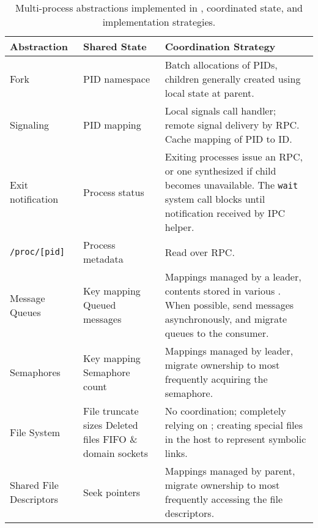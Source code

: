 \begin{table}
\footnotesize
\centering
\begin{tabular}{|p{}|p{}|p{}|}
\hline
{\bf Ab\-strac\-tion} & {\bf Shared State} & {\bf Coordination Strategy} \\
\hline
Fork & 
\raggedright
PID namespace & Batch allocations of PIDs, children generally created using local state at parent.  \\
\hline
Signaling & PID mapping & Local signals call handler; remote signal delivery by RPC.  Cache mapping of PID to \picoproc{} ID. \\
\hline
\raggedright
Exit notification & 
\raggedright
Process status  & Exiting processes issue an RPC, or one synthesized if child becomes unavailable.  The {\tt wait} system call blocks until notification received by IPC helper. \\
\hline
{\tt /proc/[pid]} & Process metadata & Read over RPC.  \\
\hline
Message Queues & 
\raggedright
Key mapping \newline
Queued messages &
Mappings managed by a leader, contents stored in various \picoprocs{}.  When possible, send messages asynchronously, and migrate queues to the consumer.\\
\hline
Semaphores & 
\raggedright
Key mapping \newline
Semaphore count &
Mappings managed by leader, migrate ownership to \picoproc{} most frequently acquiring the semaphore. \\
\hline
\raggedright
File System & 
\raggedright
File truncate sizes \newline
Deleted files \newline
FIFO \& domain sockets
& No coordination; completely relying on \thehostabi{}; creating special files in the host to represent symbolic links. \\
\hline
\raggedright
Shared File Descriptors & 
\raggedright
Seek pointers & Mappings managed by parent, migrate ownership to \picoproc{} most frequently accessing the file descriptors. \\
\hline
\end{tabular}
\caption{Multi-process abstractions implemented in \graphene{}, coordinated state, and implementation strategies.}
\label{tab:libos:multiproc}
\end{table}






